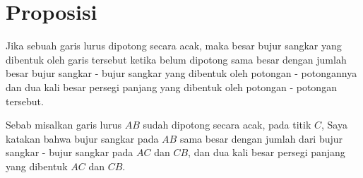 \documentclass[a4paper]{book}
\begin{document}
\section*{\centering Proposisi \thesection} 
Jika sebuah garis lurus dipotong secara acak, maka besar bujur sangkar yang dibentuk
oleh garis tersebut ketika belum dipotong sama besar dengan jumlah besar 
bujur sangkar - bujur sangkar
yang dibentuk oleh potongan - potongannya dan dua kali besar persegi panjang 
yang dibentuk oleh potongan - potongan tersebut.

\begin{center}
\end{center}

Sebab misalkan garis lurus $AB$ sudah dipotong secara acak, pada titik $C$, Saya
katakan bahwa bujur sangkar pada $AB$ sama besar dengan jumlah dari 
bujur sangkar - bujur sangkar pada $AC$ dan $CB$, dan dua kali besar persegi panjang
yang dibentuk $AC$ dan $CB$.
\end{document}
